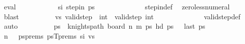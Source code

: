 \begin{isabellebody}
\ eval{\isacharplus}{\kern0pt}\isanewline
\ \ \ \ \ \ \ \ \isamarkupfalse%
\ \isamarkupfalse%
\ si{\isacharcolon}{\kern0pt}\ {\isachardoublequoteopen}step{\isacharunderscore}{\kern0pt}in\ {\isacharquery}{\kern0pt}ps\ {\isacharparenleft}{\kern0pt}{}{\isacharcomma}{\kern0pt}{}{\isacharparenright}{\kern0pt}\ {\isacharparenleft}{\kern0pt}{}{\isacharcomma}{\kern0pt}{}{\isacharparenright}{\kern0pt}{\isachardoublequoteclose}\isanewline
\ \ \ \ \ \ \ \ \ \ \isamarkupfalse%
\ step{\isacharunderscore}{\kern0pt}in{\isacharunderscore}{\kern0pt}def\ \isamarkupfalse%
\ zero{\isacharunderscore}{\kern0pt}less{\isacharunderscore}{\kern0pt}numeral\ \isamarkupfalse%
\ blast\isanewline
\isanewline
\ \ \ \ \ \ \ \ \isamarkupfalse%
\ vs{\isacharcolon}{\kern0pt}\ {\isachardoublequoteopen}valid{\isacharunderscore}{\kern0pt}step\ {\isacharparenleft}{\kern0pt}{}{\isacharcomma}{\kern0pt}{}{\isacharparenright}{\kern0pt}\ {\isacharparenleft}{\kern0pt}int\ {}{\isacharplus}{\kern0pt}{}{\isacharcomma}{\kern0pt}{}{\isacharparenright}{\kern0pt}{\isachardoublequoteclose}\ {\isachardoublequoteopen}valid{\isacharunderscore}{\kern0pt}step\ {\isacharparenleft}{\kern0pt}int\ {}{\isacharplus}{\kern0pt}{}{\isacharcomma}{\kern0pt}{}{\isacharparenright}{\kern0pt}\ {\isacharparenleft}{\kern0pt}{}{\isacharcomma}{\kern0pt}{}{\isacharparenright}{\kern0pt}{\isachardoublequoteclose}\isanewline
\ \ \ \ \ \ \ \ \ \ \isamarkupfalse%
\ valid{\isacharunderscore}{\kern0pt}step{\isacharunderscore}{\kern0pt}def\ \isamarkupfalse%
\ auto\isanewline
\isanewline
\ \ \ \ \ \ \ \ \isamarkupfalse%
\ ps\ \ {\isachardoublequoteopen}knights{\isacharunderscore}{\kern0pt}path\ {\isacharparenleft}{\kern0pt}board\ n\ m{\isacharparenright}{\kern0pt}\ ps{\isachardoublequoteclose}\ {\isachardoublequoteopen}hd\ ps\ {\isacharequal}{\kern0pt}\ {\isacharparenleft}{\kern0pt}{}{\isacharcomma}{\kern0pt}{}{\isacharparenright}{\kern0pt}{\isachardoublequoteclose}\ {\isachardoublequoteopen}last\ ps\ {\isacharequal}{\kern0pt}\ {\isacharparenleft}{\kern0pt}{}{\isacharcomma}{\kern0pt}{}{\isacharparenright}{\kern0pt}{\isachardoublequoteclose}\isanewline
\ \ \ \ \ \ \ \ \ \ \isamarkupfalse%
\ {\isacartoucheopen}n{\isacharminus}{\kern0pt}{}\ {\isasymge}\ {}{\isacartoucheclose}\ psprems\ psT{\isacharunderscore}{\kern0pt}prems\ si\ vs\isanewline

\end{isabellebody}
